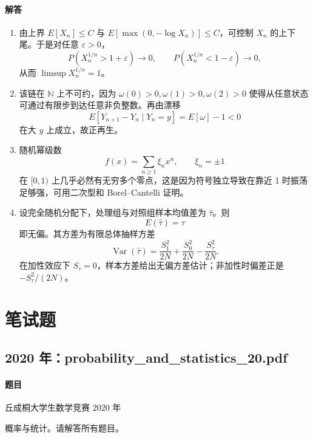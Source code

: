 \documentclass[UTF8,12pt]{ctexart}
\begin{document}
\paragraph{解答}
\begin{enumerate}[label=\textbf{\arabic*.},leftmargin=2.2em]
\item 由上界 \(E[X_n]\le C\) 与 \(E[\max(0,-\log X_n)]\le C\)，可控制 \(X_n\) 的上下尾。于是对任意 \(\varepsilon>0\)，
\[
P(X_n^{1/n}>1+\varepsilon)\to0,\qquad P(X_n^{1/n}<1-\varepsilon)\to0,
\]
从而 \(\limsup X_n^{1/n}=1\)。

\item 该链在 \(\mathbb N\) 上不可约，因为 \(\omega(0)>0,\omega(1)>0,\omega(2)>0\) 使得从任意状态可通过有限步到达任意非负整数。再由漂移
\[
E[Y_{n+1}-Y_n\mid Y_n=y]=E[\omega]-1<0
\]
在大 \(y\) 上成立，故正再生。

\item 随机幂级数
\[
f(x)=\sum_{n\ge1}\xi_n x^n,\qquad \xi_n=\pm1
\]
在 \([0,1)\) 上几乎必然有无穷多个零点，这是因为符号独立导致在靠近 1 时振荡足够强，可用二次型和 Borel--Cantelli 证明。

\item 设完全随机分配下，处理组与对照组样本均值差为 \(\hat\tau\)。则
\[
E(\hat\tau)=\tau
\]
即无偏。其方差为有限总体抽样方差
\[
\operatorname{Var}(\hat\tau)=\frac{S_1^2}{2N}+\frac{S_0^2}{2N}-\frac{S_\tau^2}{2N}.
\]
在加性效应下 \(S_\tau=0\)，样本方差给出无偏方差估计；非加性时偏差正是 \(-S_\tau^2/(2N)\)。
\end{enumerate}

\section{笔试题}
\subsection{2020 年：probability\_and\_statistics\_20.pdf}
\paragraph{题目}
丘成桐大学生数学竞赛 2020 年

概率与统计。请解答所有题目。
\end{document}
